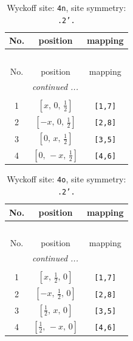 \documentclass[fleqn,8pt]{jsarticle}
\begin{document}
\renewcommand{\arraystretch}{1.2}
\begin{longtable}{ccc}
\caption{Wyckoff site: {\tt 4n}, site symmetry: {\tt .2'.}}
 \\
 \hline \hline
No. & position & mapping \\ \hline \endfirsthead

\multicolumn{2}{l}{\tablename\ \thetable{}} \\
 \hline \hline
No. & position & mapping \\ \hline \endhead

 \hline \hline
\multicolumn{2}{r}{\footnotesize\it continued ...} \\ \endfoot

 \hline \hline
\multicolumn{2}{r}{} \\ \endlastfoot

1 & $\left[ x,\, 0,\, \frac{1}{2} \right]$ & {\tt [1,7]} \\ \hline
2 & $\left[ - x,\, 0,\, \frac{1}{2} \right]$ & {\tt [2,8]} \\ \hline
3 & $\left[ 0,\, x,\, \frac{1}{2} \right]$ & {\tt [3,5]} \\ \hline
4 & $\left[ 0,\, - x,\, \frac{1}{2} \right]$ & {\tt [4,6]} \\
\end{longtable}
\renewcommand{\arraystretch}{1.2}
\begin{longtable}{ccc}
\caption{Wyckoff site: {\tt 4o}, site symmetry: {\tt .2'.}}
 \\
 \hline \hline
No. & position & mapping \\ \hline \endfirsthead

\multicolumn{2}{l}{\tablename\ \thetable{}} \\
 \hline \hline
No. & position & mapping \\ \hline \endhead

 \hline \hline
\multicolumn{2}{r}{\footnotesize\it continued ...} \\ \endfoot

 \hline \hline
\multicolumn{2}{r}{} \\ \endlastfoot

1 & $\left[ x,\, \frac{1}{2},\, 0 \right]$ & {\tt [1,7]} \\ \hline
2 & $\left[ - x,\, \frac{1}{2},\, 0 \right]$ & {\tt [2,8]} \\ \hline
3 & $\left[ \frac{1}{2},\, x,\, 0 \right]$ & {\tt [3,5]} \\ \hline
4 & $\left[ \frac{1}{2},\, - x,\, 0 \right]$ & {\tt [4,6]} \\
\end{longtable}
\end{document}
